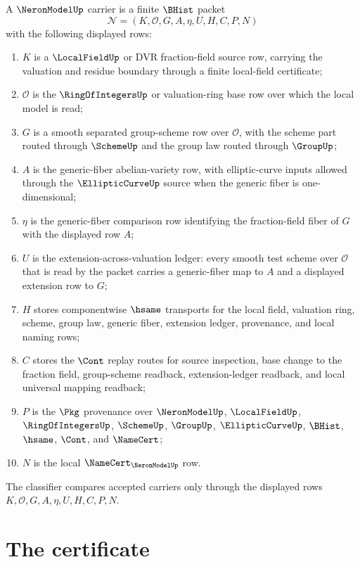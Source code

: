 \begin{definition}
\label{def:neron-model-carrier}
A $\NeronModelUp$ carrier is a finite $\BHist$ packet
$$
\mathcal N=(K,\mathcal O,G,A,\eta,U,H,C,P,N)
$$
with the following displayed rows:
\begin{enumerate}
\item $K$ is a $\LocalFieldUp$ or DVR fraction-field source row, carrying the valuation and residue boundary through a finite local-field certificate;
\item $\mathcal O$ is the $\RingOfIntegersUp$ or valuation-ring base row over which the local model is read;
\item $G$ is a smooth separated group-scheme row over $\mathcal O$, with the scheme part routed through $\SchemeUp$ and the group law routed through $\GroupUp$;
\item $A$ is the generic-fiber abelian-variety row, with elliptic-curve inputs allowed through the $\EllipticCurveUp$ source when the generic fiber is one-dimensional;
\item $\eta$ is the generic-fiber comparison row identifying the fraction-field fiber of $G$ with the displayed row $A$;
\item $U$ is the extension-across-valuation ledger: every smooth test scheme over $\mathcal O$ that is read by the packet carries a generic-fiber map to $A$ and a displayed extension row to $G$;
\item $H$ stores componentwise $\hsame$ transports for the local field, valuation ring, scheme, group law, generic fiber, extension ledger, provenance, and local naming rows;
\item $C$ stores the $\Cont$ replay routes for source inspection, base change to the fraction field, group-scheme readback, extension-ledger readback, and local universal mapping readback;
\item $P$ is the $\Pkg$ provenance over $\NeronModelUp$, $\LocalFieldUp$, $\RingOfIntegersUp$, $\SchemeUp$, $\GroupUp$, $\EllipticCurveUp$, $\BHist$, $\hsame$, $\Cont$, and $\NameCert$;
\item $N$ is the local $\NameCert_{\NeronModelUp}$ row.
\end{enumerate}
The classifier compares accepted carriers only through the displayed rows $K,\mathcal O,G,A,\eta,U,H,C,P,N$.
\end{definition}

\section{The certificate}
\label{sec:neron-model-certificate}

